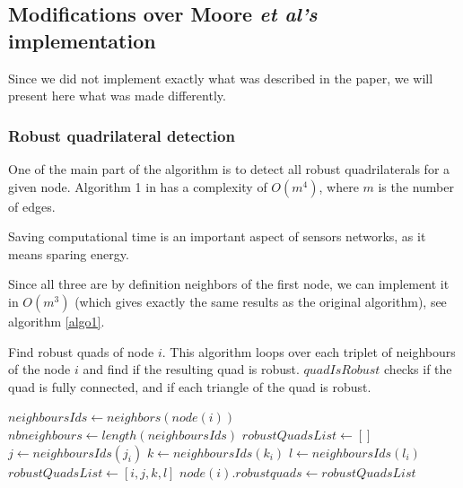 \documentclass[letterpaper, 10 pt, conference]{ieeeconf}  %
\begin{document}



\subsection{Modifications over Moore \emph{et al's} implementation}

Since we did not implement exactly what was described in the paper, we will present here what was made differently.

\subsubsection{Robust quadrilateral detection}

One of the main part of the algorithm is to detect all robust quadrilaterals for a given node. Algorithm 1 in \cite{MooreTeller} has a complexity of $O(m^4)$, where $m$ is the number of edges. 

Saving computational time is an important aspect of sensors networks, as it means sparing energy.

Since all three are by definition neighbors of the first node, we can implement it in $O(m^3)$ (which gives exactly the same results as the original algorithm), see algorithm \ref{algo1}.

\begin{algorithm}
\caption{\label{algo1}Find robust quads of node $i$. This algorithm loops over each triplet of neighbours of the node $i$ and find if the resulting quad is robust. $quadIsRobust$ checks if the quad is fully connected, and if each triangle of the quad is robust.}
\begin{algorithmic} 
\STATE $neighboursIds \leftarrow neighbors(node(i))$
\STATE $nbneighbours \leftarrow length(neighboursIds)$ 
\STATE $robustQuadsList \leftarrow []$ 
\STATE $j \leftarrow neighboursIds(j_i)$ 
\STATE $k \leftarrow neighboursIds(k_i)$
\STATE $l \leftarrow neighboursIds(l_i)$ \newline
{} 
\STATE $robustQuadsList \leftarrow [i, j, k, l]$
\ENDIF 
\newline
\ENDFOR
\ENDFOR
\ENDFOR 
\STATE $node(i).robustquads \leftarrow robustQuadsList$
\end{algorithmic}
\end{algorithm}
\end{document}
